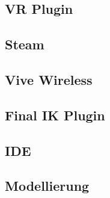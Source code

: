\subsection{VR Plugin}

\subsection{Steam}

\subsection{Vive Wireless}

\subsection{Final IK Plugin}

\subsection{IDE}

\subsection{Modellierung}

